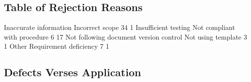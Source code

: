 \documentclass{article}
\begin{document}
\subsection{Table of Rejection Reasons}
\begin{Schunk}
\begin{Soutput}
                Inaccurate information                        Incorrect scope 
                                    34                                      1 
                  Insufficient testing           Not compliant with procedure 
                                     6                                     17 
Not following document version control                     Not using template 
                                     3                                      1 
                                 Other                 Requirement deficiency 
                                     7                                      1 
\end{Soutput}
\end{Schunk}

\subsection{Defects Verses Application}
\end{document}
